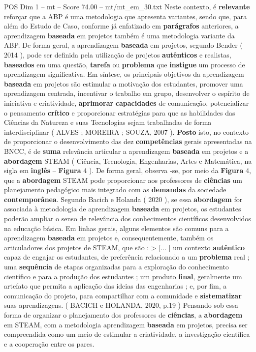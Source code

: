 \begin{textsample}{POS Dim 1 – mt – Score 74.00 – mt/mt\_em\_30.txt}
Neste contexto, é \textbf{relevante} reforçar que a ABP é uma metodologia que apresenta variantes, sendo que, para além do Estudo de Caso, conforme já enfatizado em \textbf{parágrafos} anteriores, a aprendizagem \textbf{baseada} em projetos também é uma metodologia variante da ABP.
De forma geral, a aprendizagem \textbf{baseada} em projetos, segundo Bender ( 2014 ), pode ser definida pela utilização de projetos \textbf{autênticos} e realistas, \textbf{baseados} em uma questão, \textbf{tarefa} ou \textbf{problema} que \textbf{instigue} um processo de aprendizagem significativa.
Em síntese, os principais objetivos da aprendizagem \textbf{baseada} em projetos são estimular a motivação dos estudantes, promover uma aprendizagem centrada, incentivar o trabalho em grupo, desenvolver o espírito de iniciativa e criatividade, \textbf{aprimorar} \textbf{capacidades} de comunicação, potencializar o pensamento \textbf{crítico} e proporcionar estratégias para que as habilidades das Ciências da Natureza e suas Tecnologias sejam trabalhadas de forma interdisciplinar ( ALVES ; MOREIRA ; SOUZA, 2007 ). \textbf{Posto} isto, no contexto de proporcionar o desenvolvimento das dez \textbf{competências} gerais apresentadas na BNCC, é de \textbf{suma} relevância articular a aprendizagem \textbf{baseada} em projetos e a \textbf{abordagem} STEAM ( Ciência, Tecnologia, Engenharias, Artes e Matemática, na sigla em \textbf{inglês} – \textbf{Figura} 4 ).
De forma geral, observa -se, por meio da \textbf{Figura} 4, que a \textbf{abordagem} STEAM pode proporcionar aos professores de \textbf{ciências} um planejamento pedagógico mais integrado com as \textbf{demandas} da sociedade \textbf{contemporânea}.
Segundo Bacich e Holanda ( 2020 ), se essa \textbf{abordagem} for associada à metodologia de aprendizagem \textbf{baseada} em projetos, os estudantes poderão ampliar o senso de relevância dos conhecimentos científicos desenvolvidos na educação básica.
Em linhas gerais, alguns elementos são comuns para a aprendizagem \textbf{baseada} em projetos e, consequentemente, também os articuladores dos projetos de STEAM, que são : > [... ] um contexto \textbf{autêntico} capaz de engajar os estudantes, de preferência relacionado a um \textbf{problema} real ; uma \textbf{sequência} de etapas organizadas para a exploração do conhecimento científico e para a produção dos estudantes ; um produto \textbf{final}, geralmente um artefato que permita a aplicação das ideias das engenharias ; e, por fim, a comunicação do projeto, para compartilhar com a comunidade e \textbf{sistematizar} suas aprendizagens. ( BACICH e HOLANDA, 2020, p.19 ) Pensando sob essa forma de organizar o planejamento dos professores de \textbf{ciências}, a \textbf{abordagem} em STEAM, com a metodologia aprendizagem \textbf{baseada} em projetos, precisa ser compreendida como um meio de estimular a criatividade, a investigação científica e a cooperação entre os pares.

\end{textsample}
